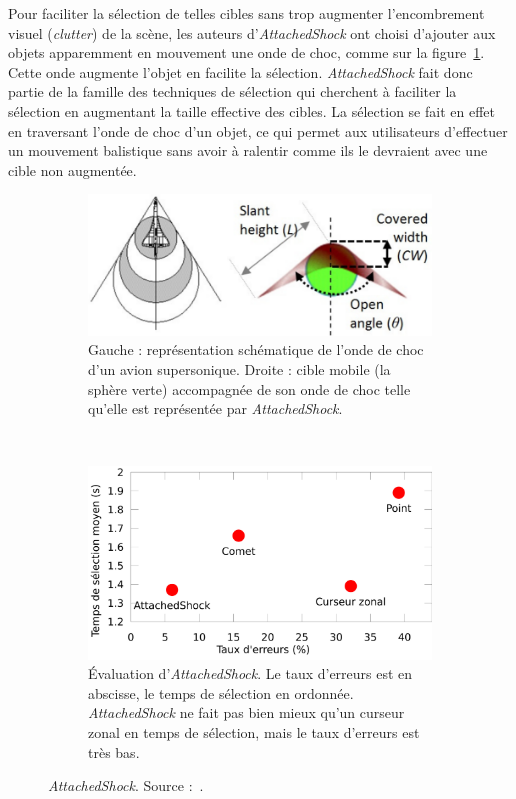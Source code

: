 	Pour faciliter la sélection de telles cibles sans trop augmenter l'encombrement visuel (\emph{clutter}) de la scène, les auteurs d'\emph{AttachedShock} ont choisi d'ajouter aux objets apparemment en mouvement une onde de choc, comme sur la figure~\ref{fig:asas}. Cette onde augmente l'objet en facilite la sélection. \emph{AttachedShock} fait donc partie de la famille des techniques de sélection qui cherchent à faciliter la sélection en augmentant la taille effective des cibles. La sélection se fait en effet en \og traversant \fg{} l'onde de choc d'un objet, ce qui permet aux utilisateurs d'effectuer un mouvement balistique sans avoir à ralentir comme ils le devraient avec une cible non augmentée.
	
	\begin{figure}[!htbp]
		\centering
		\begin{subfigure}[t]{0.48\textwidth}
			\centering
			\includegraphics[width=\textwidth]{figures/ch2/asas}
			\caption{Gauche : représentation schématique de l'onde de choc d'un avion supersonique. Droite : cible mobile (la sphère verte) accompagnée de son onde de choc telle qu'elle est représentée par \emph{AttachedShock}.}
			\label{fig:asas}
		\end{subfigure}
		~
		\begin{subfigure}[t]{0.48\textwidth}
			\centering
			\includegraphics[width=\textwidth]{figures/ch2/asRes}
			\caption{Évaluation d'\emph{AttachedShock}. Le taux d'erreurs est en abscisse, le temps de sélection en ordonnée. \emph{AttachedShock} ne fait pas bien mieux qu'un curseur zonal en temps de sélection, mais le taux d'erreurs est très bas.}
			\label{fig:asRes}
		\end{subfigure}
		\caption{\emph{AttachedShock}. Source :~\cite{you2012attachedshock}.}
		\label{fig:asMain}
	\end{figure}
	
